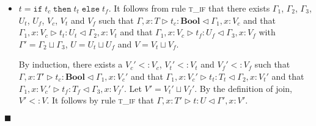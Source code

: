 \documentclass{article}
\newcommand{\tif}{\textsc{t\_if} }
\newcommand{\typerule}[4]{#1 \triangleright #2 : #3 \triangleleft #4}
\newcommand{\boolt}{\mathbf{Bool}}
\newcommand{\ift}[3]{\mathtt{if} \; #1 \; \mathtt{then} \; #2 \; \mathtt{else} \; #3}
\newcommand{\qed}{$\blacksquare$}
\newenvironment{proof}{\vspace{1ex}\noindent{\bf Proof}\hspace{0.5em}}
  {\hfill\qed\vspace{1ex}}
\begin{document}
\begin{proof}
\begin{itemize}
\item $t = \ift{t_c}{t_t}{t_f}$. It follows from rule \tif that there
exists $\Gamma_1$, $\Gamma_2$, $\Gamma_3$, $U_t$, $U_f$, $V_c$, $V_t$ and
$V_f$
such that
$\typerule{\Gamma, x : T}{t_c}{\boolt}{\Gamma_1, x : V_c}$ and that
$\typerule{\Gamma_1, x : V_c}{t_t}{U_t}{\Gamma_2, x : V_t}$ and that
$\typerule{\Gamma_1, x : V_c}{t_f}{U_f}{\Gamma_3, x : V_f}$ with
$\Gamma' = \Gamma_2 \sqcup \Gamma_3$, $U = U_t \sqcup U_f$ and
$V = V_t \sqcup V_f$.

By induction, there exists a $V_c' <: V_c$, $V_t' <: V_t$ and $V_f' <: V_f$ 
such that $\typerule{\Gamma, x : T'}{t_c}{\boolt}{\Gamma_1, x : V_c'}$
and that $\typerule{\Gamma_1, x : V_c'}{t_t}{T_t}{\Gamma_2, x : V_t'}$
and that $\typerule{\Gamma_1, x : V_c'}{t_f}{T_f}{\Gamma_3, x : V_f'}$.
Let $V' = V_t' \sqcup V_f'$. By the definition of join, $V' <: V$.
It follows by rule \tif that
$\typerule{\Gamma, x : T'}{t}{U}{\Gamma', x : V'}$.

\end{itemize}

\end{proof}
\end{document}
